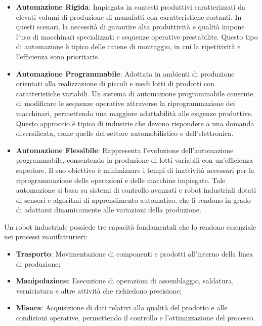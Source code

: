 ﻿\documentclass[11pt, a4paper]{article}
\begin{document}
\begin{itemize}
    \item \textbf{Automazione Rigida}: Impiegata in contesti produttivi caratterizzati da elevati volumi di produzione di manufatti con caratteristiche costanti. In questi scenari, la necessità di garantire alta produttività e qualità impone l'uso di macchinari specializzati e sequenze operative prestabilite. Questo tipo di automazione è tipico delle catene di montaggio, in cui la ripetitività e l'efficienza sono prioritarie.
    \item \textbf{Automazione Programmabile}: Adottata in ambienti di produzione orientati alla realizzazione di piccoli e medi lotti di prodotti con caratteristiche variabili. Un sistema di automazione programmabile consente di modificare le sequenze operative attraverso la riprogrammazione dei macchinari, permettendo una maggiore adattabilità alle esigenze produttive. Questo approccio è tipico di industrie che devono rispondere a una domanda diversificata, come quelle del settore automobilistico e dell'elettronica.
    \item \textbf{Automazione Flessibile}: Rappresenta l'evoluzione dell'automazione programmabile, consentendo la produzione di lotti variabili con un'efficienza superiore. Il suo obiettivo è minimizzare i tempi di inattività necessari per la riprogrammazione delle operazioni e delle macchine impiegate. Tale automazione si basa su sistemi di controllo avanzati e robot industriali dotati di sensori e algoritmi di apprendimento automatico, che li rendono in grado di adattarsi dinamicamente alle variazioni della produzione.
\end{itemize}

Un robot industriale possiede tre capacità fondamentali che lo rendono essenziale nei processi manifatturieri:

\begin{itemize}
    \item \textbf{Trasporto}: Movimentazione di componenti e prodotti all'interno della
    linea di produzione;
    \item \textbf{Manipolazione}: Esecuzione di operazioni di assemblaggio, saldatura, verniciatura e altre attività che richiedono precisione;
    \item \textbf{Misura}: Acquisizione di dati relativi alla qualità del prodotto e alle condizioni operative, permettendo il controllo e l'ottimizzazione del processo.
\end{itemize}
\end{document}
